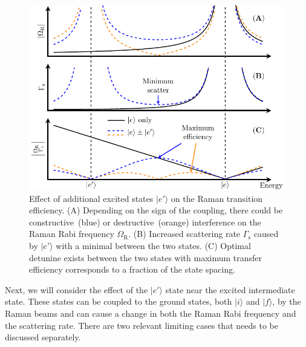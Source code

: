 \begin{figure}
  \centering
  \includegraphics[width=\textwidth]{figures/raman_transfer_extra_ext_states.pdf}
  \caption[Raman transition with additional excited states]{
    Effect of additional excited states $|e'\rangle$ on the Raman transition efficiency.
    (A) Depending on the sign of the coupling, there could be constructive~(blue)
    or destructive~(orange) interference on the Raman Rabi frequency $\Omega_{\mathrm{R}}$.
    (B) Increased scattering rate $\Gamma_{\mathrm{s}}$ caused by $|e'\rangle$ with a minimal
    between the two states.
    (C) Optimal detunine exists between the two states with maximum transfer efficiency
    corresponds to a fraction of the state spacing.
    \label{fig:raman-transfer:raman:extra-ext-states}}
\end{figure}

Next, we will consider the effect of the $|e'\rangle$ state near the excited intermediate state.
These states can be coupled to the ground states, both $|i\rangle$ and $|f\rangle$,
by the Raman beams and can cause a change in both the Raman Rabi frequency
and the scattering rate.
There are two relevant limiting cases that needs to be discussed separately.

